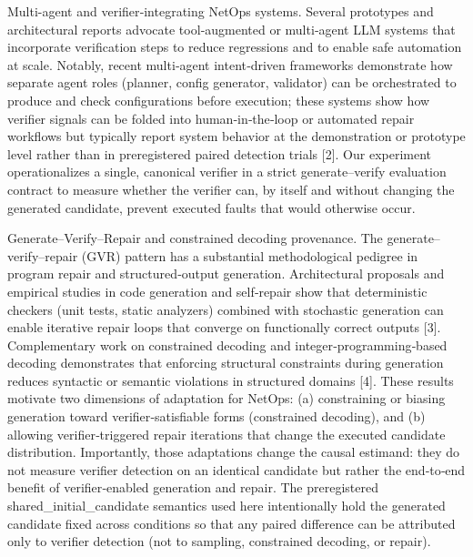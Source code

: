 \documentclass[conference]{IEEEtran}
\begin{document}
Multi-agent and verifier‑integrating NetOps systems. Several prototypes and architectural reports advocate tool‑augmented or multi‑agent LLM systems that incorporate verification steps to reduce regressions and to enable safe automation at scale. Notably, recent multi‑agent intent‑driven frameworks demonstrate how separate agent roles (planner, config generator, validator) can be orchestrated to produce and check configurations before execution; these systems show how verifier signals can be folded into human‑in‑the‑loop or automated repair workflows but typically report system behavior at the demonstration or prototype level rather than in preregistered paired detection trials [2]. Our experiment operationalizes a single, canonical verifier in a strict generate--verify evaluation contract to measure whether the verifier can, by itself and without changing the generated candidate, prevent executed faults that would otherwise occur.

Generate--Verify--Repair and constrained decoding provenance. The generate--verify--repair (GVR) pattern has a substantial methodological pedigree in program repair and structured‑output generation. Architectural proposals and empirical studies in code generation and self‑repair show that deterministic checkers (unit tests, static analyzers) combined with stochastic generation can enable iterative repair loops that converge on functionally correct outputs [3]. Complementary work on constrained decoding and integer‑programming‑based decoding demonstrates that enforcing structural constraints during generation reduces syntactic or semantic violations in structured domains [4]. These results motivate two dimensions of adaptation for NetOps: (a) constraining or biasing generation toward verifier‑satisfiable forms (constrained decoding), and (b) allowing verifier‑triggered repair iterations that change the executed candidate distribution. Importantly, those adaptations change the causal estimand: they do not measure verifier detection on an identical candidate but rather the end‑to‑end benefit of verifier‑enabled generation and repair. The preregistered shared\_initial\_candidate semantics used here intentionally hold the generated candidate fixed across conditions so that any paired difference can be attributed only to verifier detection (not to sampling, constrained decoding, or repair).
\end{document}
